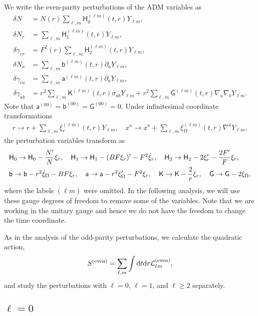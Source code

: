 \documentclass[aps,prd,preprintnumbers,superscriptaddress,nofootinbib,notitlepage]{revtex4-2}
\newcommand*{\D}{{\rm d}}
\begin{document}
We write the even-parity perturbations of the ADM variables as
\begin{align}
\delta N&= N(r) \sum_{\ell,m}\mathsf{H}_0^{(\ell m)}(t,r)Y_{\ell m},
\\
\delta N_r&=\sum_{\ell,m}\mathsf{H}_1^{(\ell m)}(t,r)Y_{\ell m},
\\
\delta\gamma_{rr}&=F^2(r)\sum_{\ell,m}\mathsf{H}_2^{(\ell m)}(t,r)Y_{\ell m},
\\
\delta N_a&=\sum_{\ell,m}\mathsf{b}^{(\ell m)}(t,r)\partial_aY_{\ell m},
\\
\delta \gamma_{ra}&=\sum_{\ell,m}\mathsf{a}^{(\ell m)}(t,r)\partial_aY_{\ell m},
\\
\delta \gamma_{ab}&=r^2\sum_{\ell,m}\mathsf{K}^{(\ell m)}(t,r)\sigma_{ab}Y_{\ell m}
+r^2\sum_{\ell,m}\mathsf{G}^{(\ell m)}(t,r)\nabla_a\nabla_bY_{\ell m}.
\end{align}
Note that $\mathsf{a}^{(0 0)}=\mathsf{b}^{(0 0)}=\mathsf{G}^{(0 0)}=0$. 
Under infinitesimal coordinate transformations
\begin{align}
r\to r+\sum_{\ell, m}\xi_r^{(\ell m)}(t,r)Y_{\ell m},
\quad
x^a \to x^a+\sum_{\ell, m}\xi_\Omega^{(\ell m)}(t,r)\nabla^aY_{\ell m},
\end{align}
the perturbation variables transform as
\begin{align}
&\mathsf{H}_0\to\mathsf{H}_0-\frac{N'}{N}\xi_r,
\quad
\mathsf{H}_1\to\mathsf{H}_1-(BF\xi_r)'-F^2\dot\xi_r,
\quad
\mathsf{H}_2\to\mathsf{H}_2-2\xi_r'-\frac{2F'}{F}\xi_r,
  \notag \\
  &
  \mathsf{b}\to\mathsf{b}-r^2\dot\xi_\Omega-BF\xi_r,\quad 
  \mathsf{a}\to \mathsf{a}-r^2\xi_\Omega'- F^2 \xi_r,\quad
\mathsf{K}\to \mathsf{K}-\frac{2}{r}\xi_r,\quad \mathsf{G}\to \mathsf{G}-2\xi_\Omega,
\label{gauge-tr}
\end{align}
where the labels $(\ell m)$ were omitted.
In the following analysis, we will use these gauge degrees of freedom to remove some of the variables.
Note that we are working in the unitary gauge and hence we do not have the freedom to change the time coordinate.


As in the analysis of the odd-parity perturbations, we calculate the quadratic action,
\begin{align}
    S^{\textrm{(even)}}=\sum_{\ell,m}\int\D t\D r\mathcal{L}_{\ell m}^{\textrm{(even)}},
\end{align}
and study the perturbations with $\ell=0$, $\ell=1$, and $\ell\ge 2$ separately.

\subsection{$\ell=0$}\label{even-parity:l=0}
\end{document}
